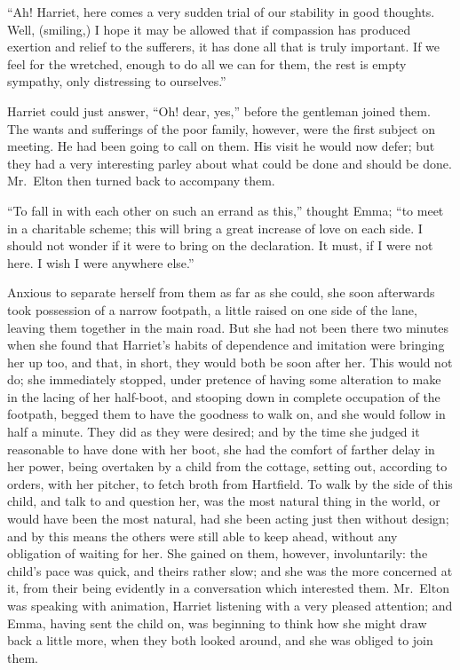``Ah!  Harriet, here comes a very sudden trial of our stability
in good thoughts.  Well, (smiling,) I hope it may be allowed that
if compassion has produced exertion and relief to the sufferers,
it has done all that is truly important.  If we feel for the wretched,
enough to do all we can for them, the rest is empty sympathy,
only distressing to ourselves.''

Harriet could just answer, ``Oh! dear, yes,'' before the gentleman
joined them.  The wants and sufferings of the poor family, however,
were the first subject on meeting.  He had been going to call
on them.  His visit he would now defer; but they had a very
interesting parley about what could be done and should be done.
Mr.\ Elton then turned back to accompany them.

``To fall in with each other on such an errand as this,'' thought Emma;
``to meet in a charitable scheme; this will bring a great increase
of love on each side.  I should not wonder if it were to bring
on the declaration.  It must, if I were not here.  I wish I were
anywhere else.''

Anxious to separate herself from them as far as she could, she soon
afterwards took possession of a narrow footpath, a little raised
on one side of the lane, leaving them together in the main road.
But she had not been there two minutes when she found that Harriet's
habits of dependence and imitation were bringing her up too, and that,
in short, they would both be soon after her.  This would not do;
she immediately stopped, under pretence of having some alteration
to make in the lacing of her half-boot, and stooping down in complete
occupation of the footpath, begged them to have the goodness to walk on,
and she would follow in half a minute.  They did as they were desired;
and by the time she judged it reasonable to have done with her boot,
she had the comfort of farther delay in her power, being overtaken
by a child from the cottage, setting out, according to orders,
with her pitcher, to fetch broth from Hartfield.  To walk by the side
of this child, and talk to and question her, was the most natural
thing in the world, or would have been the most natural, had she been
acting just then without design; and by this means the others were
still able to keep ahead, without any obligation of waiting for her.
She gained on them, however, involuntarily:  the child's pace was quick,
and theirs rather slow; and she was the more concerned at it,
from their being evidently in a conversation which interested them.
Mr.\ Elton was speaking with animation, Harriet listening with a very
pleased attention; and Emma, having sent the child on, was beginning
to think how she might draw back a little more, when they both
looked around, and she was obliged to join them.

